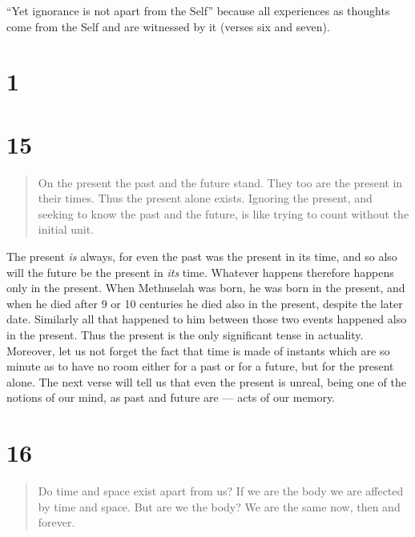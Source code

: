 \documentclass[12pt]{report}
\begin{document}
``Yet ignorance is not apart from the Self'' because all experiences
as thoughts come from the Self and are witnessed by it (verses six and
seven). 

\section*{1}

\begin{quote}

\end{quote}




\section*{15}

\begin{quote}
On the present the past and the future stand. They too are the present
in their times. Thus the present alone exists. Ignoring the present,
and seeking to know the past and the future, is like trying to count
without the initial unit.
\end{quote}

The present \emph{is} always, for even the past was the present in its
time, and so also will the future be the present in \emph{its}
time. Whatever happens therefore happens only in the present. When
Methuselah was born, he was born in the present, and when he died
after 9 or 10 centuries he died also in the present, despite the later
date. Similarly all that happened to him between those two events
happened also in the present. Thus the present is the only significant
tense in actuality. Moreover, let us not forget the fact that time is
made of instants which are so minute as to have no room either for a
past or for a future, but for the present alone. The next verse will
tell us that even the present is unreal, being one of the notions of
our mind, as past and future are --- acts of our memory.


\section*{16}

\begin{quote}
Do time and space exist apart from us? If we are the body we are
affected by time and space. But are we the body? We are the same now,
then and forever.
\end{quote}
\end{document}
